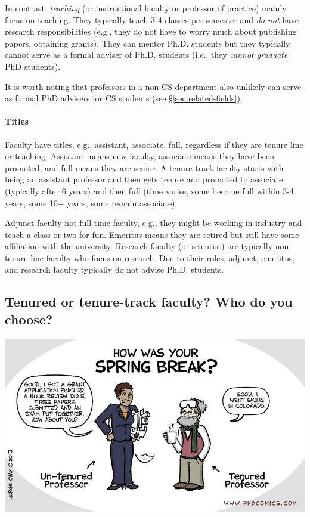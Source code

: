 \documentclass[oneside,11pt]{memoir}
\begin{document}
In contrast, \emph{teaching} (or instructional faculty or professor of practice) mainly focus on teaching. They typically teach 3-4 classes per semester and \emph{do not} have research responsibilities (e.g., they do not have to worry much about publishing papers, obtaining grants).  They can mentor Ph.D. students but they typically cannot serve as a formal adviser of Ph.D. students (i.e., they \emph{cannot graduate} PhD students).  

It is worth noting that professors in a non-CS department also unlikely can serve as formal PhD advisers for CS students (see \S\ref{sec:related-fields}).

\paragraph{Titles} Faculty have titles, e.g., assistant, associate, full, regardless if they are tenure line or teaching.  Assistant means new faculty, associate means they have been promoted, and full means they are senior. A tenure track faculty starts with being an assistant professor and then gets tenure and promoted to associate (typically after 6 years) and then full (time varies, some become full within 3-4 years, some 10+ years, some remain associate). 

Adjunct faculty not full-time faculty, e.g., they might be working in industry and teach a class or two for fun.  Emeritus means they are retired but still have some affiliation with the university.  Research faculty (or scientist) are typically non-tenure line faculty who focus on research.  Due to their roles, adjunct, emeritus, and research faculty typically do not advise Ph.D. students.

\subsection{Tenured or tenure-track faculty? Who do you choose?}\label{sec:tenure-vs-tenure-track}

      \begin{center}
        \includegraphics[scale=0.4]{c8.png}
      \end{center}
\end{document}
